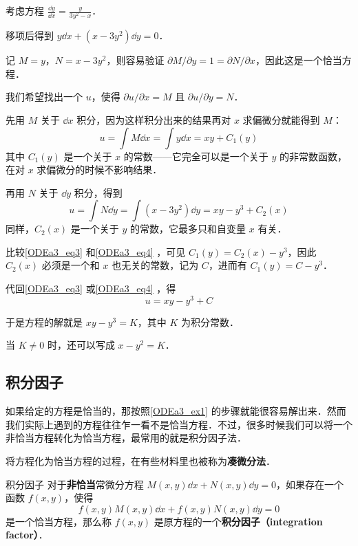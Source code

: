 \begin{example}{}\label{ODEa3_ex1}
考虑方程 $\frac{\dd y}{\dd x}=\frac{y}{3y^2-x}$．

移项后得到 $y\dd x+(x-3y^2)\dd y=0$．

记 $M=y$，$N=x-3y^2$，则容易验证 $\partial M/\partial y= 1 =\partial N/\partial x$，因此这是一个恰当方程．

我们希望找出一个 $u$，使得 $\partial u/\partial x=M$ 且 $\partial u/\partial y=N$．

先用 $M$ 关于 $\dd x$ 积分，因为这样积分出来的结果再对 $x$ 求偏微分就能得到 $M$：
\begin{equation}\label{ODEa3_eq3}
u=\int M\dd x=\int y\dd x=xy+C_1(y)
\end{equation}
其中 $C_1(y)$ 是一个关于 $x$ 的常数——它完全可以是一个关于 $y$ 的非常数函数，在对 $x$ 求偏微分的时候不影响结果．

再用 $N$ 关于 $\dd y$ 积分，得到
\begin{equation}\label{ODEa3_eq4}
u=\int N\dd y=\int (x-3y^2)\dd y=xy-y^3+C_2(x)
\end{equation}
同样，$C_2(x)$ 是一个关于 $y$ 的常数，它最多只和自变量 $x$ 有关．

比较\autoref{ODEa3_eq3} 和\autoref{ODEa3_eq4} ，可见 $C_1(y)=C_2(x)-y^3$，因此 $C_2(x)$ 必须是一个和 $x$ 也无关的常数，记为 $C$，进而有 $C_1(y)=C-y^3$．

代回\autoref{ODEa3_eq3} 或\autoref{ODEa3_eq4} ，得
\begin{equation}
u=xy-y^3+C
\end{equation}

于是方程的解就是 $xy-y^3=K$，其中 $K$ 为积分常数．

当 $K\not=0$ 时，还可以写成 $x-y^2=K$．

\end{example}


\subsection{积分因子}

如果给定的方程是恰当的，那按照\autoref{ODEa3_ex1} 的步骤就能很容易解出来．然而我们实际上遇到的方程往往乍一看不是恰当方程．不过，很多时候我们可以将一个非恰当方程转化为恰当方程，最常用的就是积分因子法．

将方程化为恰当方程的过程，在有些材料里也被称为\textbf{凑微分法}．

\begin{definition}{积分因子}
对于\textbf{非恰当}常微分方程 $M(x, y)\dd x+N(x, y)\dd y=0$，如果存在一个函数 $f(x, y)$，使得
\begin{equation}\label{ODEa3_eq5}
f(x, y)M(x, y)\dd x+f(x, y)N(x, y)\dd y=0
\end{equation}
是一个恰当方程，那么称 $f(x, y)$ 是原方程的一个\textbf{积分因子（integration factor）}．
\end{definition}

